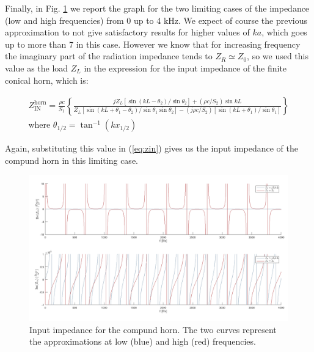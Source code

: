 \documentclass[a4paper]{article}
\begin{document}
Finally, in Fig. \ref{fig:q4} we report the graph for the two limiting cases of the impedance (low and high frequencies) from 0 up to 4 kHz. We expect of course the previous approximation to not give satisfactory results for higher values of $ka$, which goes up to more than 7 in this case. However we know that for increasing frequency the imaginary part of the radiation impedance tends to $Z_R \simeq Z_0$, so we used this value as the load $Z_L$ in the expression for the input impedance of the finite conical horn, which is:

$$
\begin{array}{c}
	Z_{\mathrm{IN}}^{\mathrm{horn}}=\frac{\rho c}{S_{1}}\left\{\frac{j Z_{L}\left[\sin \left(k L-\theta_{2}\right) / \sin \theta_{2}\right]+\left(\rho c / S_{2}\right) \sin k L}{Z_{L}\left[\sin \left(k L+\theta_{1}-\theta_{2}\right) / \sin \theta_{1} \sin \theta_{2}\right]-\left(j \rho c / S_{2}\right)\left[\sin \left(k L+\theta_{1}\right) / \sin \theta_{1}\right]}\right\} \\
	\text{where }\theta_{1 / 2}=\tan ^{-1}\left(k x_{1 / 2}\right)
\end{array}
$$

Again, substituting this value in (\ref{eq:zin}) gives us the input impedance of the compund horn in this limiting case.

\begin{figure}[h!]
	\centering
	\includegraphics[width=0.9\linewidth]{q4.png}
	\caption{Input impedance for the compund horn. The two curves represent the approximations at low (blue) and high (red) frequencies.}
	\label{fig:q4}
\end{figure}
\end{document}
